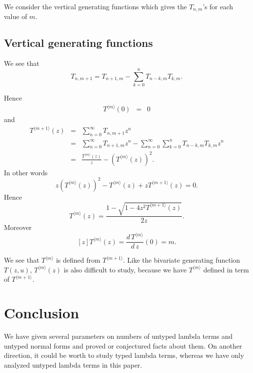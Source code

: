 \documentclass[preprint,authoryear]{elsarticle}
\begin{document}
We consider the vertical generating functions which gives the $T_{n,m}$'s for each value
of $m$.










\subsection*{Vertical generating functions}
\label{sec:vert-gener-funct}


We see that 
\[T_{n,m+1} = T_{n+1,m} - \sum_{k=0}^n T_{n-k,m} T_{k,m}.\]

Hence
\begin{eqnarray*}
  T^{\langle m\rangle} (0) &=& 0
\end{eqnarray*}
and
\begin{eqnarray*}
  T^{\langle m+1\rangle} (z) &=& \sum_{n=0}^{\infty} T_{n,m+1}  z^n\\
&=& \sum_{n=0}^{\infty} T_{n+1,m}  z^n - \sum_{n=0}^{\infty} \sum_{k=0}^n T_{n-k,m} T_{k,m} z^n\\
&=& \frac{T^{\langle m\rangle}(z)}{z} - (T^{\langle m\rangle}(z))^2.
\end{eqnarray*}
In other words
\[ z (T^{\langle m\rangle}(z))^2 - T^{\langle m\rangle}(z) + z T^{\langle m+1\rangle}(z) =0
.\]
Hence 
\[T^{\langle m\rangle}(z) = \frac{1 - \sqrt{1-4z^2T^{\langle m+1\rangle}(z)}}{2z}.\]
Moreover
\[[z]T^{\langle m\rangle}(z) = \frac{d \,T^{\langle m\rangle}}{d\,z}(0) = m.\]

We see that $T^{\langle m\rangle}$ is defined from $T^{\langle m+1\rangle}$.  Like the
bivariate generating function $T(z,u)$, $T^{\langle m\rangle}(z)$  is also difficult to
study, because we have $T^{\langle m\rangle}$ defined in term of 
$T^{\langle m+1\rangle}$.

\section{Conclusion}
\label{sec:conclusion}

We have given several parameters on numbers of untyped lambda terms and untyped normal
forms and proved or conjectured facts about them.  On another direction, it could be worth
to study typed lambda terms, whereas we have only analyzed untyped lambda terms in this
paper.

\nocite{bruijn58:_asymp_method_analy}
\end{document}
